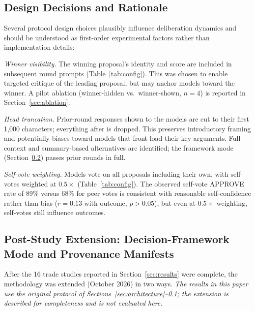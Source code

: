 \documentclass[11pt,a4paper]{article}
\begin{document}
\subsection{Design Decisions and Rationale}
\label{sec:design_decisions}

Several protocol design choices plausibly influence deliberation dynamics and should be understood as first-order experimental factors rather than implementation details:

\textit{Winner visibility.} The winning proposal's identity and score are included in subsequent round prompts (Table~\ref{tab:config}). This was chosen to enable targeted critique of the leading proposal, but may anchor models toward the winner. A pilot ablation (winner-hidden vs.\ winner-shown, $n=4$) is reported in Section~\ref{sec:ablation}.

\textit{Head truncation.} Prior-round responses shown to the models are cut to their first 1{,}000 characters; everything after is dropped. This preserves introductory framing and potentially biases toward models that front-load their key arguments. Full-context and summary-based alternatives are identified; the framework mode (Section~\ref{sec:extension}) passes prior rounds in full.

\textit{Self-vote weighting.} Models vote on all proposals including their own, with self-votes weighted at $0.5\times$ (Table~\ref{tab:config}). The observed self-vote APPROVE rate of 89\% versus 68\% for peer votes is consistent with reasonable self-confidence rather than bias ($r = 0.13$ with outcome, $p > 0.05$), but even at $0.5\times$ weighting, self-votes still influence outcomes.

\subsection{Post-Study Extension: Decision-Framework Mode and Provenance Manifests}
\label{sec:extension}

After the 16 trade studies reported in Section~\ref{sec:results} were complete, the methodology was extended (October 2026) in two ways. \emph{The results in this paper use the original protocol of Sections~\ref{sec:architecture}--\ref{sec:design_decisions}; the extension is described for completeness and is not evaluated here.}
\end{document}
